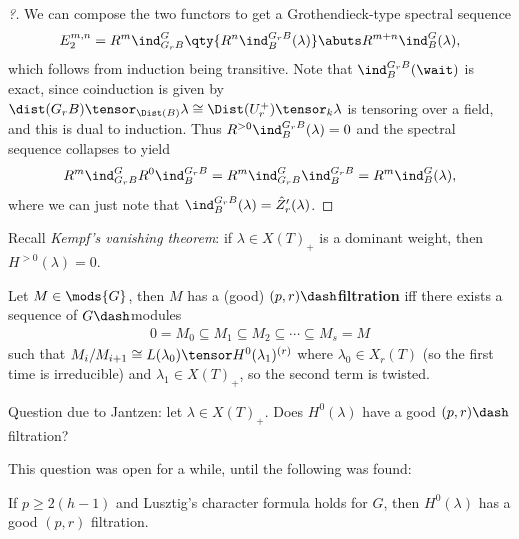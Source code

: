 \begin{proof}[?]

We can compose the two functors to get a Grothendieck-type spectral
sequence
\begin{align*}  
E_2^{m, n} = R^m \ind_{G_r B}^{G} \qty{ R^n \ind_{B}^{G_r B}(\lambda) }
\abuts
R^{m+n} \ind_B^G(\lambda)
,\end{align*} which follows from induction being transitive. Note that
\(\ind_{B}^{G_r B}(\wait)\) is exact, since coinduction is given by
\(\dist(G_rB)\tensor_{\Dist(B)}\lambda \cong \Dist(U_r^+)\tensor_k \lambda\)
is tensoring over a field, and this is dual to induction. Thus
\(R^{>0} \ind_B^{G_r B}(\lambda) = 0\) and the spectral sequence
collapses to yield
\begin{align*}  
R^m \ind_{G_r B}^G R^0 \ind_{B}^{G_r B} 
= R^m \ind_{G_r B}^G \ind_{B}^{G_r B} 
= R^m \ind_B^G(\lambda)
,\end{align*} where we can just note that
\(\ind_B^{G_r B}(\lambda) = \hat{Z}_r'(\lambda)\).

\end{proof}

Recall \emph{Kempf's vanishing theorem}: if \(\lambda \in X(T)_+\) is a
dominant weight, then \(H^{>0}(\lambda) = 0\).

\begin{definition}

Let \(M\in \mods{G}\), then \(M\) has a (good)
\textbf{\((p, r)\dash\)filtration} iff there exists a sequence of
\(G\dash\)modules
\begin{align*}  
0 = M_0 \subseteq M_1 \subseteq M_2 \subseteq \cdots \subseteq M_s = M
\end{align*} such that
\(M_i / M_{i+1} \cong L(\lambda_0) \tensor H^0(\lambda_1)^{(r)}\) where
\(\lambda_0 \in X_r(T)\) (so the first time is irreducible) and
\(\lambda_1 \in X(T)_+\), so the second term is twisted.

\end{definition}

\begin{remark}

Question due to Jantzen: let \(\lambda \in X(T)_+\). Does
\(H^0(\lambda)\) have a good \((p, r)\dash\)filtration?

\end{remark}

This question was open for a while, until the following was found:

\begin{proposition}

If \(p\geq 2(h-1)\) and Lusztig's character formula holds for \(G\),
then \(H^0(\lambda)\) has a good \((p, r)\) filtration.

\end{proposition}

